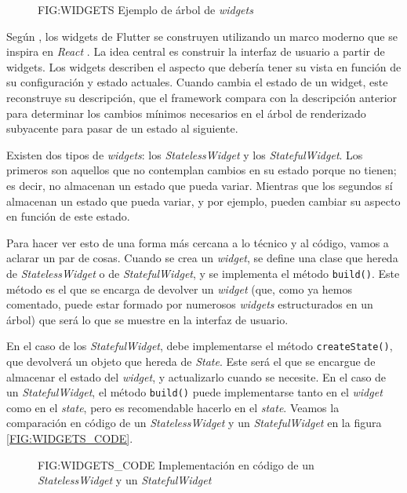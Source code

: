 \begin{figure}[Ejemplo de árbol de \textit{widgets}]{FIG:WIDGETS}
  {Ejemplo de árbol de \textit{widgets}}
\end{figure}

Según \cite{flutter_ui}, los widgets de Flutter se construyen utilizando un marco moderno que se inspira en \textit{React} \cite{react}. 
La idea central es construir la interfaz de usuario a partir de widgets. Los widgets describen el aspecto que debería 
tener su vista en función de su configuración y estado actuales. Cuando cambia el estado de un widget, este reconstruye 
su descripción, que el framework compara con la descripción anterior para determinar los cambios mínimos necesarios en el 
árbol de renderizado subyacente para pasar de un estado al siguiente.

Existen dos tipos de \textit{widgets}: los \textit{StatelessWidget} y los \textit{StatefulWidget}. Los primeros son aquellos que no contemplan
cambios en su estado porque no tienen; es decir, no almacenan un estado que pueda variar. Mientras que los segundos sí almacenan un estado que pueda
variar, y por ejemplo, pueden cambiar su aspecto en función de este estado.

Para hacer ver esto de una forma más cercana a lo técnico y al código, vamos a aclarar un par de cosas. Cuando se crea un \textit{widget}, se define una clase
que hereda de \textit{StatelessWidget} o de \textit{StatefulWidget}, y se implementa el método \texttt{build()}. Este método es el que se encarga de devolver
un \textit{widget} (que, como ya hemos comentado, puede estar formado por numerosos \textit{widgets} estructurados en un árbol) que será lo que se muestre en 
la interfaz de usuario.

En el caso de los \textit{StatefulWidget}, debe implementarse el método \texttt{createState()}, que devolverá un objeto que hereda de \textit{State}.
Este será el que se encargue de almacenar el estado del \textit{widget}, y actualizarlo cuando se necesite. En el caso de un \textit{StatefulWidget}, el método
\texttt{build()} puede implementarse tanto en el \textit{widget} como en el \textit{state}, pero es recomendable hacerlo en el \textit{state}.
Veamos la comparación en código de un \textit{StatelessWidget} y un \textit{StatefulWidget} en la figura \ref{FIG:WIDGETS_CODE}.

\begin{figure}[Implementación en código de un \textit{StatelessWidget} y un \textit{StatefulWidget}]{FIG:WIDGETS_CODE}
  {Implementación en código de un \textit{StatelessWidget} y un \textit{StatefulWidget}}
   \quad
\end{figure}



